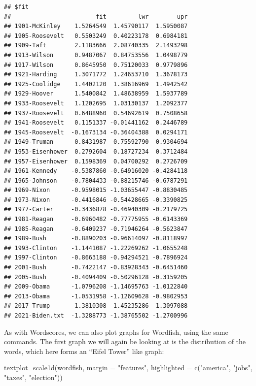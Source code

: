 \documentclass[
]{article}
\newenvironment{Shaded}{\begin{snugshade}}{\end{snugshade}}
\newcommand{\AttributeTok}[1]{\textcolor[rgb]{0.77,0.63,0.00}{#1}}
\newcommand{\FunctionTok}[1]{\textcolor[rgb]{0.00,0.00,0.00}{#1}}
\newcommand{\NormalTok}[1]{#1}
\newcommand{\StringTok}[1]{\textcolor[rgb]{0.31,0.60,0.02}{#1}}
\begin{document}
\begin{verbatim}
## $fit
##                        fit         lwr        upr
## 1901-McKinley    1.5264549  1.45790117  1.5950087
## 1905-Roosevelt   0.5503249  0.40223178  0.6984181
## 1909-Taft        2.1183666  2.08740335  2.1493298
## 1913-Wilson      0.9487067  0.84753556  1.0498779
## 1917-Wilson      0.8645950  0.75120033  0.9779896
## 1921-Harding     1.3071772  1.24653710  1.3678173
## 1925-Coolidge    1.4402120  1.38616969  1.4942542
## 1929-Hoover      1.5400842  1.48638959  1.5937789
## 1933-Roosevelt   1.1202695  1.03130137  1.2092377
## 1937-Roosevelt   0.6488960  0.54692619  0.7508658
## 1941-Roosevelt   0.1151337 -0.01441162  0.2446789
## 1945-Roosevelt  -0.1673134 -0.36404388  0.0294171
## 1949-Truman      0.8431987  0.75592790  0.9304694
## 1953-Eisenhower  0.2792604  0.18727234  0.3712484
## 1957-Eisenhower  0.1598369  0.04700292  0.2726709
## 1961-Kennedy    -0.5387860 -0.64916020 -0.4284118
## 1965-Johnson    -0.7804433 -0.88215746 -0.6787291
## 1969-Nixon      -0.9598015 -1.03655447 -0.8830485
## 1973-Nixon      -0.4416846 -0.54428665 -0.3390825
## 1977-Carter     -0.3436878 -0.46940309 -0.2179725
## 1981-Reagan     -0.6960482 -0.77775955 -0.6143369
## 1985-Reagan     -0.6409237 -0.71946264 -0.5623847
## 1989-Bush       -0.8890203 -0.96614097 -0.8118997
## 1993-Clinton    -1.1441087 -1.22269262 -1.0655248
## 1997-Clinton    -0.8663188 -0.94294521 -0.7896924
## 2001-Bush       -0.7422147 -0.83928343 -0.6451460
## 2005-Bush       -0.4094409 -0.50296128 -0.3159205
## 2009-Obama      -1.0796208 -1.14695763 -1.0122840
## 2013-Obama      -1.0531958 -1.12609628 -0.9802953
## 2017-Trump      -1.3810308 -1.45235286 -1.3097088
## 2021-Biden.txt  -1.3288773 -1.38765502 -1.2700996
\end{verbatim}

As with Wordscores, we can also plot graphs for Wordfish, using the same commands. The first graph we will again be looking at is the distribution of the words, which here forms an ``Eifel Tower'' like graph:

\begin{Shaded}
\begin{Highlighting}[]
\FunctionTok{textplot\_scale1d}\NormalTok{(wordfish, }\AttributeTok{margin =} \StringTok{"features"}\NormalTok{, }\AttributeTok{highlighted =} \FunctionTok{c}\NormalTok{(}\StringTok{"america"}\NormalTok{,}
    \StringTok{"jobs"}\NormalTok{, }\StringTok{"taxes"}\NormalTok{, }\StringTok{"election"}\NormalTok{))}
\end{Highlighting}
\end{Shaded}
\end{document}
